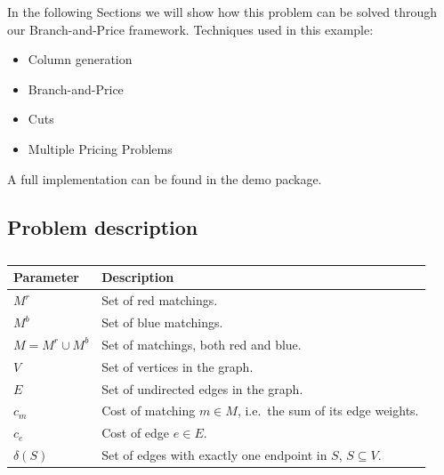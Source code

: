\documentclass[a4paper]{article}
\begin{document}
In the following Sections we will show how this problem can be solved through our Branch-and-Price framework. Techniques used in this example:
\begin{itemize}
 \item Column generation
 \item Branch-and-Price
 \item Cuts
 \item Multiple Pricing Problems
\end{itemize}
A full implementation can be found in the demo package.

\subsection{Problem description}
\begin{table}[h]
\begin{tabular}{ll}
\toprule
\textbf{Parameter} 	& \textbf{Description}\\
\midrule
$M^r$		& Set of red matchings.\\
$M^b$		& Set of blue matchings.\\
$M=M^r\cup M^b$		& Set of matchings, both red and blue.\\
$V$		& Set of vertices in the graph.\\
$E$		& Set of undirected edges in the graph.\\
$c_m$		& Cost of matching $m\in M$, i.e.\ the sum of its edge weights.\\
$c_e$		& Cost of edge $e\in E$.\\
$\delta(S)$	& Set of edges with exactly one endpoint in $S$, $S\subseteq V$.\\
\bottomrule
\end{tabular}
\caption{}
\label{tbl:tsp} 
\end{table}
\end{document}
